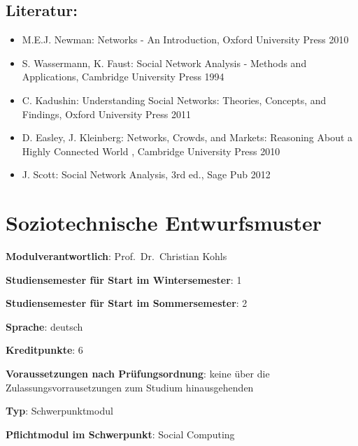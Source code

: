 \section*{Literatur:\label{/mi-2017/modulbeschreibungen-master/MA_SC_Modul_Netzwerk--und-Graphentheorie}}\label{literaturpathlabelmi-2017modulbeschreibungen-mastermaux5fscux5fmodulux5fnetzwerkund-graphentheorie}

\begin{itemize}
\tightlist
\item
  M.E.J. Newman: Networks - An Introduction, Oxford University Press
  2010
\item
  S. Wassermann, K. Faust: Social Network Analysis - Methods and
  Applications, Cambridge University Press 1994
\item
  C. Kadushin: Understanding Social Networks: Theories, Concepts, and
  Findings, Oxford University Press 2011
\item
  D. Easley, J. Kleinberg: Networks, Crowds, and Markets: Reasoning
  About a Highly Connected World , Cambridge University Press 2010
\item
  J. Scott: Social Network Analysis, 3rd ed., Sage Pub 2012
\end{itemize}

\chapter{Soziotechnische
Entwurfsmuster\label{/mi-2017/modulbeschreibungen-master/MA_SC_Soziotechnische_Entwurfsmuster}}\label{soziotechnische-entwurfsmusterpathlabelmi-2017modulbeschreibungen-mastermaux5fscux5fsoziotechnischeux5fentwurfsmuster}

\begin{modulHead}
\textbf{Modulverantwortlich}: Prof.~Dr.~Christian
Kohls
\end{modulHead}
\begin{modulHead}
\textbf{Studiensemester für
Start im Wintersemester}:
1
\end{modulHead}
\begin{modulHead}
\textbf{Studiensemester für Start
im Sommersemester}:
2
\end{modulHead}
\begin{modulHead}
\textbf{Sprache}:
deutsch
\end{modulHead}
\begin{modulHead}
\textbf{Kreditpunkte}:
6
\end{modulHead}
\begin{modulHead}
\textbf{Voraussetzungen nach
Prüfungsordnung}: keine über die Zulassungsvorrausetzungen zum Studium
hinausgehenden
\end{modulHead}
\begin{modulHead}
\textbf{Typ}:
Schwerpunktmodul
\end{modulHead}
\begin{modulHead}
\textbf{Pflichtmodul
im Schwerpunkt}: Social Computing
\end{modulHead}


